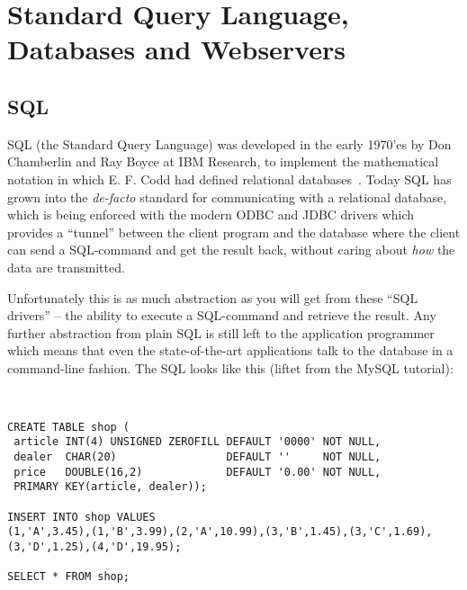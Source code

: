 \chapter{Standard Query Language, Databases and Webservers}


\section{SQL}

SQL (the Standard Query Language) was developed in the early 1970'es
by Don Chamberlin and Ray Boyce at IBM Research, to implement the
mathematical notation in which E. F. Codd had defined relational
databases~\cite{a-relational-model-of-data-for-large-shared-databanks}.
Today SQL has grown into the \textit{de-facto} standard for
communicating with a relational database, which is being enforced with
the modern ODBC and JDBC drivers which provides a ``tunnel'' between
the client program and the database where the client can send a
SQL-command and get the result back, without caring about \textit{how}
the data are transmitted.

Unfortunately this is as much abstraction as you will get from these
``SQL drivers'' -- the ability to execute a SQL-command and retrieve
the result.  Any further abstraction from plain SQL is still left to
the application programmer which means that even the state-of-the-art
applications talk to the database in a command-line fashion.   The SQL
looks like this (liftet from the MySQL tutorial):

\begin{verbatim}


CREATE TABLE shop (
 article INT(4) UNSIGNED ZEROFILL DEFAULT '0000' NOT NULL,
 dealer  CHAR(20)                 DEFAULT ''     NOT NULL,
 price   DOUBLE(16,2)             DEFAULT '0.00' NOT NULL,
 PRIMARY KEY(article, dealer));

INSERT INTO shop VALUES
(1,'A',3.45),(1,'B',3.99),(2,'A',10.99),(3,'B',1.45),(3,'C',1.69),
(3,'D',1.25),(4,'D',19.95);

SELECT * FROM shop;

\end{verbatim}

